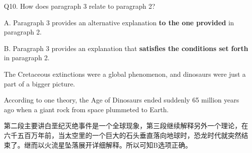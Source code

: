 \begin{blk}
    \begin{qst}
        Q10. How does paragraph 3 relate to paragraph 2?
    \end{qst}

    \begin{chc}
        A. Paragraph 3 provides an alternative explanation \textbf{to the one provided} in paragraph 2.

        B. Paragraph 3 provides an explanation that \textbf{satisfies the conditions set forth} in paragraph 2.
    \end{chc}

    \begin{psgq}
        The Cretaceous extinctions were a global phenomenon, and dinosaurs were just a part of a bigger picture.

        According to one theory, the Age of Dinosaurs ended suddenly 65 million years ago when a giant rock from space plummeted to Earth.
    \end{psgq}

    \begin{nlz}
        第二段主要讲白垩纪灭绝事件是一个全球现象，第三段继续解释另外一个理论，在六千五百万年前，当太空里的一个巨大的石头垂直落向地球时，恐龙时代就突然结束了。继而以火流星坠落展开详细解释。所以可知B选项正确。
    \end{nlz}
\end{blk}

